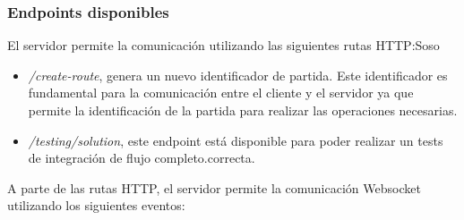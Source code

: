 \subsubsection{Endpoints disponibles}

El servidor permite la comunicación utilizando las siguientes rutas HTTP:Soso

\begin{itemize}
	\item \textit{/create-route}, genera un nuevo identificador de partida. Este identificador es fundamental para la comunicación entre el cliente y el servidor ya que permite la identificación de la partida para realizar las operaciones necesarias.
	\item \textit{/testing/solution}, este endpoint está disponible para poder realizar un tests de integración de flujo completo.correcta.
\end{itemize}

A parte de las rutas HTTP, el servidor permite la comunicación Websocket utilizando los siguientes eventos:

